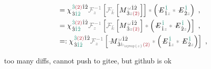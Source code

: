 \begin{subequations}
\begin{align}
	&= {\chi}^{\;\! \textcolor{PineGreen}{\hat{3}} \textcolor{Maroon}{(2)} \hat{1} \hat{2} }_{\;\! \hat{3} \textcolor{PineGreen}{\hat{1} \hat{2}}} \mathcolor{gray}{\mathcal F_{z}^{-1}} \left[ \mathcolor{gray}{\mathcal F_{\bar{k}}} \left[ M^{\;\! \mathcolor{gray}{\omega} \hat{1} \hat{2} }_{\;\! \hat{3} \mathcolor{gray}{z} \textcolor{Maroon}{(2)} } \right] \right] \mathcolor{gray}{*} \left( \Xint{\mathcolor{gray}{-}}{295}{E}^{\;\!\textcolor{PineGreen}{\hat{1}}}_{\;\! \hat{1} \mathcolor{gray}{z}} \mathcolor{gray}{*} \Xint{\mathcolor{gray}{-}}{295}{E}^{\;\!\textcolor{PineGreen}{\hat{1}}}_{\;\! \hat{2} \mathcolor{gray}{z}} \right) ~, \label{eq:DP^(2)-3_12-C4} \\
	&= {\chi}^{\;\! \textcolor{PineGreen}{\hat{3}} \textcolor{Maroon}{(2)} \hat{1} \hat{2} }_{\;\! \hat{3} \textcolor{PineGreen}{\hat{1} \hat{2}}} \mathcolor{gray}{\mathcal F_{z}^{-1}} \left[ \mathcolor{gray}{\mathcal F_{\bar{k}}} \left[ M^{\;\! \mathcolor{gray}{\omega} \hat{1} \hat{2} }_{\;\! \hat{3} \mathcolor{gray}{z} \textcolor{Maroon}{(2)} } \right] \mathcolor{gray}{*} \left( \Xint{\mathcolor{gray}{-}}{295}{E}^{\;\!\textcolor{PineGreen}{\hat{1}}}_{\;\! \hat{1} \mathcolor{gray}{z}} \mathcolor{gray}{*} \Xint{\mathcolor{gray}{-}}{295}{E}^{\;\!\textcolor{PineGreen}{\hat{1}}}_{\;\! \hat{2} \mathcolor{gray}{z}} \right) \right] ~, \label{eq:DP^(2)-3_12-C5} \\
	&=: {\chi}^{\;\! \textcolor{PineGreen}{\hat{3}} \textcolor{Maroon}{(2)} \hat{1} \hat{2} }_{\;\! \hat{3} \textcolor{PineGreen}{\hat{1} \hat{2}}} \mathcolor{gray}{\mathcal F_{z}^{-1}} \left[ \Xint{\mathcolor{gray}{-}}{18}{M}^{\;\! \mathcolor{gray}{\omega} \hat{1} \hat{2} }_{\;\! \hat{3} \mathcolor{gray}{k_{\symup{z}}} \textcolor{Maroon}{(2)} } \mathcolor{gray}{*} \left( \Xint{\mathcolor{gray}{-}}{295}{E}^{\;\!\textcolor{PineGreen}{\hat{1}}}_{\;\! \hat{1} \mathcolor{gray}{z}} \mathcolor{gray}{*} \Xint{\mathcolor{gray}{-}}{295}{E}^{\;\!\textcolor{PineGreen}{\hat{1}}}_{\;\! \hat{2} \mathcolor{gray}{z}} \right) \right] ~, \label{eq:DP^(2)-3_12-C6}
\end{align}
\end{subequations}

\cite{dregerSecondharmonicGenerationNonlinear1990,zubairyAnalyticApproachSecondharmonic1985}

too many diffs, cannot push to gitee, but github is ok

\cite{katoSecondharmonicGeneration20481986,katoTemperaturetuned90Phasematching1994,brunerTemperaturedependentSellmeierEquation2003,jundtTemperaturedependentSellmeierEquation1997,katoSellmeierThermoopticDispersion2002}